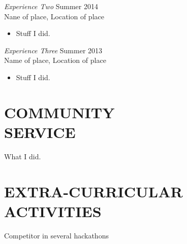 \documentclass[margin]{res}
\begin{document}
\begin{resume}
                 {\sl Experience Two} \hfill            Summer 2014 \\
                 Nane of place, Location of place
                 \begin{itemize}  \itemsep -2pt %
                 \item Stuff I did.
                 \end{itemize} 
                 {\sl Experience Three} \hfill        Summer 2013 \\
                 Name of place, Location of place
                 \begin{itemize}
                 \item Stuff I did.
                 \end{itemize} 
                 
                 \section{COMMUNITY \\ SERVICE}
			What I did.

                 \section{EXTRA-CURRICULAR \\ ACTIVITIES}             
                 Competitor in several hackathons
                 

                 \end{resume}
                 
\end{document}
